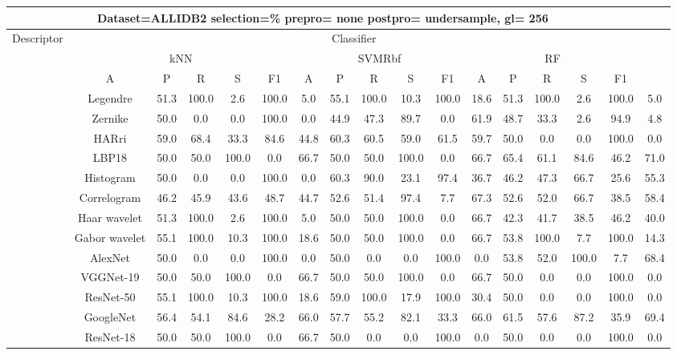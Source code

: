 \documentclass[12pt,italian]{article}
\begin{document}
\begin{tiny}
\begin{longtable}{lcccccccccccccccc}
\toprule
\multicolumn{16}{c}{Dataset=ALLIDB2 selection=\% prepro= none postpro= undersample, gl= 256} \\ 
\toprule
Descriptor & \multicolumn{15}{c}{Classifier} \\ 
& \multicolumn{5}{c}{kNN} & \multicolumn{5}{c}{SVMRbf} & \multicolumn{5}{c}{RF} \\ 
& A & P & R & S & F1 & A & P & R & S & F1 & A & P & R & S & F1 \\ 
\midrule
& Legendre & 51.3 & 100.0 &  2.6 & 100.0 &  5.0 & 55.1 & 100.0 & 10.3 & 100.0 & 18.6 & 51.3 & 100.0 &  2.6 & 100.0 &  5.0 \\ 
& Zernike & 50.0 &  0.0 &  0.0 & 100.0 &  0.0 & 44.9 & 47.3 & 89.7 &  0.0 & 61.9 & 48.7 & 33.3 &  2.6 & 94.9 &  4.8 \\ 
& HARri & 59.0 & 68.4 & 33.3 & 84.6 & 44.8 & 60.3 & 60.5 & 59.0 & 61.5 & 59.7 & 50.0 &  0.0 &  0.0 & 100.0 &  0.0 \\ 
& LBP18 & 50.0 & 50.0 & 100.0 &  0.0 & 66.7 & 50.0 & 50.0 & 100.0 &  0.0 & 66.7 & 65.4 & 61.1 & 84.6 & 46.2 & 71.0 \\ 
& Histogram & 50.0 &  0.0 &  0.0 & 100.0 &  0.0 & 60.3 & 90.0 & 23.1 & 97.4 & 36.7 & 46.2 & 47.3 & 66.7 & 25.6 & 55.3 \\ 
& Correlogram & 46.2 & 45.9 & 43.6 & 48.7 & 44.7 & 52.6 & 51.4 & 97.4 &  7.7 & 67.3 & 52.6 & 52.0 & 66.7 & 38.5 & 58.4 \\ 
& Haar wavelet & 51.3 & 100.0 &  2.6 & 100.0 &  5.0 & 50.0 & 50.0 & 100.0 &  0.0 & 66.7 & 42.3 & 41.7 & 38.5 & 46.2 & 40.0 \\ 
& Gabor wavelet & 55.1 & 100.0 & 10.3 & 100.0 & 18.6 & 50.0 & 50.0 & 100.0 &  0.0 & 66.7 & 53.8 & 100.0 &  7.7 & 100.0 & 14.3 \\ 
& AlexNet & 50.0 &  0.0 &  0.0 & 100.0 &  0.0 & 50.0 &  0.0 &  0.0 & 100.0 &  0.0 & 53.8 & 52.0 & 100.0 &  7.7 & 68.4 \\ 
& VGGNet-19 & 50.0 & 50.0 & 100.0 &  0.0 & 66.7 & 50.0 & 50.0 & 100.0 &  0.0 & 66.7 & 50.0 &  0.0 &  0.0 & 100.0 &  0.0 \\ 
& ResNet-50 & 55.1 & 100.0 & 10.3 & 100.0 & 18.6 & 59.0 & 100.0 & 17.9 & 100.0 & 30.4 & 50.0 &  0.0 &  0.0 & 100.0 &  0.0 \\ 
& GoogleNet & 56.4 & 54.1 & 84.6 & 28.2 & 66.0 & 57.7 & 55.2 & 82.1 & 33.3 & 66.0 & 61.5 & 57.6 & 87.2 & 35.9 & 69.4 \\ 
& ResNet-18 & 50.0 & 50.0 & 100.0 &  0.0 & 66.7 & 50.0 &  0.0 &  0.0 & 100.0 &  0.0 & 50.0 &  0.0 &  0.0 & 100.0 &  0.0 \\ 

\end{longtable}
\end{tiny}
\end{document}
